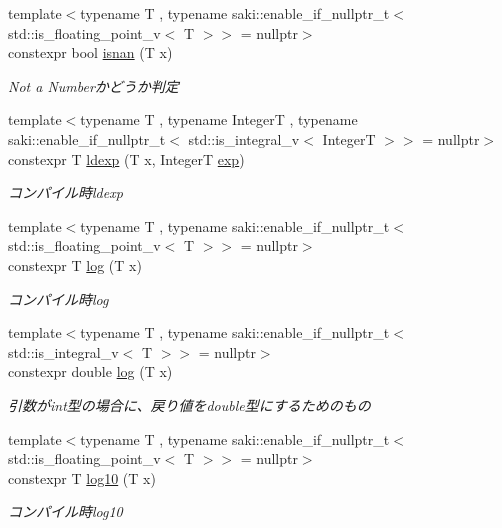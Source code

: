 \begin{DoxyCompactItemize}
{\footnotesize template$<$typename T , typename saki\+::enable\+\_\+if\+\_\+nullptr\+\_\+t$<$ std\+::is\+\_\+floating\+\_\+point\+\_\+v$<$ T $>$$>$  = nullptr$>$ }\\constexpr bool \mbox{\hyperlink{namespacesaki_a446ca3f39e4dc8e57db4aafa03a4e232}{isnan}} (T x)
\begin{DoxyCompactList}\small\item\em Not a Numberかどうか判定 \end{DoxyCompactList}\item 
{\footnotesize template$<$typename T , typename IntegerT , typename saki\+::enable\+\_\+if\+\_\+nullptr\+\_\+t$<$ std\+::is\+\_\+integral\+\_\+v$<$ Integer\+T $>$$>$  = nullptr$>$ }\\constexpr T \mbox{\hyperlink{namespacesaki_a03b7a22945dcbce6e2bb0593025c90c4}{ldexp}} (T x, IntegerT \mbox{\hyperlink{namespacesaki_abc1268e543a60d43b04f1418f5ef3e41}{exp}})
\begin{DoxyCompactList}\small\item\em コンパイル時ldexp \end{DoxyCompactList}\item 
{\footnotesize template$<$typename T , typename saki\+::enable\+\_\+if\+\_\+nullptr\+\_\+t$<$ std\+::is\+\_\+floating\+\_\+point\+\_\+v$<$ T $>$$>$  = nullptr$>$ }\\constexpr T \mbox{\hyperlink{namespacesaki_a64136b916afd50ceb9bfb93ae12c63fb}{log}} (T x)
\begin{DoxyCompactList}\small\item\em コンパイル時log \end{DoxyCompactList}\item 
{\footnotesize template$<$typename T , typename saki\+::enable\+\_\+if\+\_\+nullptr\+\_\+t$<$ std\+::is\+\_\+integral\+\_\+v$<$ T $>$$>$  = nullptr$>$ }\\constexpr double \mbox{\hyperlink{namespacesaki_a7f260fd4311e2bd21ae770f8aed6fa81}{log}} (T x)
\begin{DoxyCompactList}\small\item\em 引数がint型の場合に、戻り値をdouble型にするためのもの \end{DoxyCompactList}\item 
{\footnotesize template$<$typename T , typename saki\+::enable\+\_\+if\+\_\+nullptr\+\_\+t$<$ std\+::is\+\_\+floating\+\_\+point\+\_\+v$<$ T $>$$>$  = nullptr$>$ }\\constexpr T \mbox{\hyperlink{namespacesaki_aa1a5f3dfe15009e9e985b8b0647211e6}{log10}} (T x)
\begin{DoxyCompactList}\small\item\em コンパイル時log10 \end{DoxyCompactList}\item 

\end{DoxyCompactItemize}
